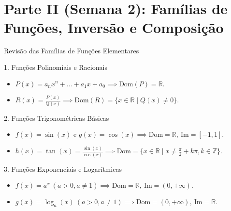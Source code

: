 \documentclass[10pt, aspectratio=169]{beamer}
\begin{document}
\section{Parte II (Semana 2): Famílias de Funções, Inversão e Composição}

\begin{frame}{Revisão das Famílias de Funções Elementares}
    \transblindshorizontal
    \begin{block}{1. Funções Polinomiais e Racionais}
        \begin{itemize}
            \item $P(x) = a_n x^n + \dots + a_1 x + a_0 \implies \text{Dom}(P) = \mathbb{R}$.
            \item $R(x) = \frac{P(x)}{Q(x)} \implies \text{Dom}(R) = \{x \in \mathbb{R} \mid Q(x) \neq 0\}$.
        \end{itemize}
    \end{block}

    \pause
    \begin{block}{2. Funções Trigonométricas Básicas}
        \begin{itemize}
            \item $f(x) = \sin(x)$ e $g(x) = \cos(x) \implies \text{Dom} = \mathbb{R}, \ \text{Im} = [-1, 1]$.
            \item $h(x) = \tan(x) = \frac{\sin(x)}{\cos(x)} \implies \text{Dom} = \{x \in \mathbb{R} \mid x \neq \frac{\pi}{2} + k\pi, k \in \mathbb{Z}\}$.
        \end{itemize}
    \end{block}

    \pause
    \begin{block}{3. Funções Exponenciais e Logarítmicas}
        \begin{itemize}
            \item $f(x) = a^x \ (a > 0, a \neq 1) \implies \text{Dom} = \mathbb{R}, \ \text{Im} = (0, +\infty)$.
            \item $g(x) = \log_a(x) \ (a > 0, a \neq 1) \implies \text{Dom} = (0, +\infty), \ \text{Im} = \mathbb{R}$.
        \end{itemize}
    \end{block}
\end{frame}
\end{document}
